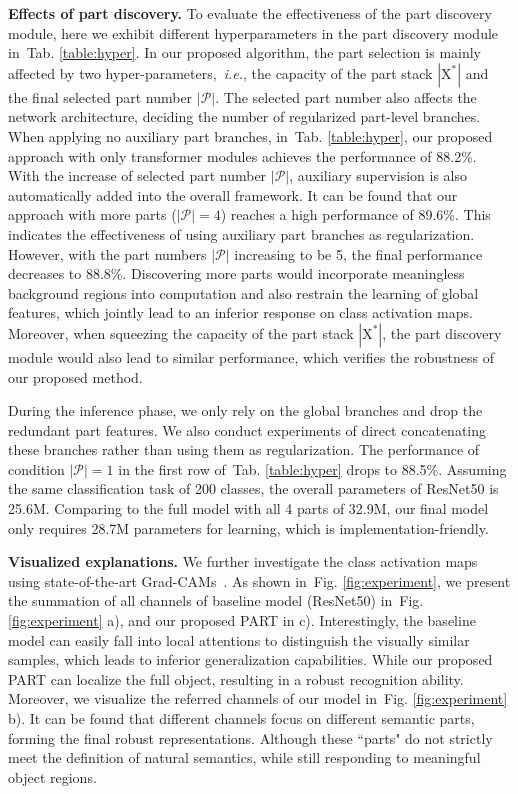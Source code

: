 \documentclass[journal]{IEEEtran}
\def\ie{{\em i.e.}}
\newcommand{\figref}[1]{Fig. \ref{#1}}
\newcommand{\tabref}[1]{Tab. \ref{#1}}
\newcommand{\mc}[1]{\mathcal{#1}}
\newcommand{\br}[1]{\bm{\mathrm{#1}}}
\begin{document}
\textbf{Effects of part discovery.} To evaluate the effectiveness of the part discovery module, here we exhibit different hyperparameters in the part discovery module in~\tabref{table:hyper}. In our proposed algorithm, the part selection is mainly affected by two hyper-parameters,~\ie, the capacity of the part stack
$|\br{X}^{*}|$ and the final selected part number $|\mc{P}|$. The selected part number also affects the network architecture, deciding the number of regularized part-level branches. When applying no auxiliary part branches, in~\tabref{table:hyper}, our proposed approach with only transformer modules achieves the performance of 88.2\%. With the increase of selected part number $|\mc{P}|$, auxiliary supervision is also automatically added into the overall framework. It can be found that our approach with more parts ($|\mc{P}|=4$) reaches a high performance of 89.6\%. This indicates the effectiveness of using auxiliary part branches as regularization. However, with the part numbers $|\mc{P}|$ increasing to be 5, the final performance decreases to 88.8\%. Discovering more parts would incorporate meaningless background regions into computation and also restrain the learning of global features, which jointly lead to an inferior response on class activation maps.
Moreover, when squeezing the capacity of the part stack $|\br{X}^{*}|$, the part discovery module would also lead to similar performance, which verifies the robustness of our proposed method.


During the inference phase, we only rely on the global branches and drop the redundant part features. We also conduct experiments of direct concatenating these branches rather than using them as regularization. The performance of condition $|\mc{P}|=1$ in the first row of~\tabref{table:hyper} drops to 88.5\%.
Assuming the same classification task of 200 classes, the overall parameters of ResNet50 is 25.6M. Comparing to the full model with all 4 parts of 32.9M, our final model only requires 28.7M parameters for learning, which is implementation-friendly.


\textbf{Visualized explanations.} We further investigate the class activation maps using state-of-the-art Grad-CAMs~\cite{selvaraju2017grad}. As shown in~\figref{fig:experiment}, we present the summation of all channels of baseline model (ResNet50) in~\figref{fig:experiment} a), and our proposed PART in c). Interestingly, the baseline model can easily fall into local attentions to distinguish the visually similar samples, which leads to inferior generalization capabilities. While our proposed PART can localize the full object, resulting in a robust recognition ability. Moreover, we visualize the referred channels of our model in~\figref{fig:experiment} b). It can be found that different channels focus on different semantic parts, forming the final robust representations. Although these ``parts" do not strictly meet the definition of natural semantics, while still responding to meaningful object regions.
\end{document}
